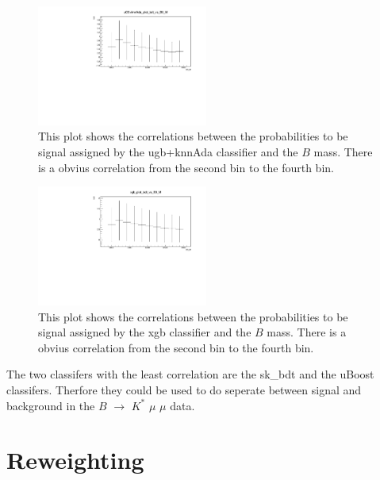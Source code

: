 \documentclass[english]{uzhpub}
\begin{document}
 \begin{figure}[H]
  \centering
  \includegraphics[width=0.5\textwidth]{plots/uGB+knnAda_plot_bdt_vs_B0_M}
  \caption{This plot shows the correlations between the probabilities to be signal assigned by the ugb+knnAda classifier and the $B$ mass. There is a obvius correlation from the second bin to the fourth bin.}
  \label{fig:uGB+knnAdaB0M}
 \end{figure}

 \begin{figure}[H]
  \centering
  \includegraphics[width=0.5\textwidth]{plots/xgb_plot_bdt_vs_B0_M}
  \caption{This plot shows the correlations between the probabilities to be signal assigned by the xgb classifier and the $B$ mass. There is a obvius correlation from the second bin to the fourth bin.}
  \label{fig:xgbB0M}
 \end{figure}

 The two classifers with the least correlation are the sk\_bdt and the uBoost classifers. Therfore they could be used to do seperate between signal and background in the $B$ $\rightarrow$ $K^{*}$ $\mu$ $\mu$ data.



 \section{Reweighting} \label{sec:Reweight}

\end{document}
